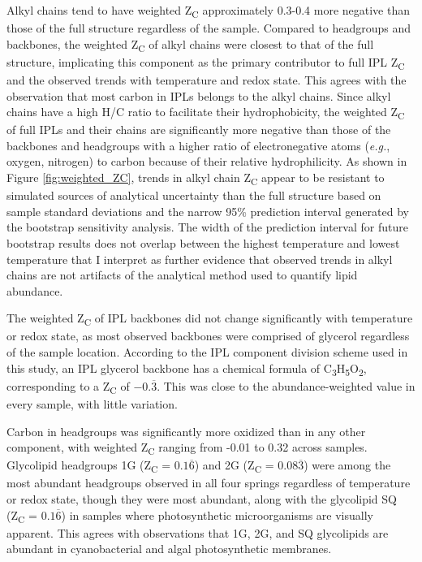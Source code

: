 Alkyl chains tend to have weighted Z\textsubscript{C} approximately 0.3-0.4 more negative than those of the full structure regardless of the sample. Compared to headgroups and backbones, the weighted Z\textsubscript{C} of alkyl chains were closest to that of the full structure, implicating this component as the primary contributor to full IPL Z\textsubscript{C} and the observed trends with temperature and redox state. This agrees with the observation that most carbon in IPLs belongs to the alkyl chains. Since alkyl chains have a high H/C ratio to facilitate their hydrophobicity, the weighted Z\textsubscript{C} of full IPLs and their chains are significantly more negative than those of the backbones and headgroups with a higher ratio of electronegative atoms (\textit{e.g.}, oxygen, nitrogen) to carbon because of their relative hydrophilicity. As shown in Figure \ref{fig:weighted_ZC}, trends in alkyl chain Z\textsubscript{C} appear to be resistant to simulated sources of analytical uncertainty than the full structure based on sample standard deviations and the narrow 95\% prediction interval generated by the bootstrap sensitivity analysis. The width of the prediction interval for future bootstrap results does not overlap between the highest temperature and lowest temperature that I interpret as further evidence that observed trends in alkyl chains are not artifacts of the analytical method used to quantify lipid abundance.

The weighted Z\textsubscript{C} of IPL backbones did not change significantly with temperature or redox state, as most observed backbones were comprised of glycerol regardless of the sample location. According to the IPL component division scheme used in this study, an IPL glycerol backbone has a chemical formula of C\textsubscript{3}H\textsubscript{5}O\textsubscript{2}, corresponding to a Z\textsubscript{C} of $-0.\overline{3}$. This was close to the abundance-weighted value in every sample, with little variation.

Carbon in headgroups was significantly more oxidized than in any other component, with weighted Z\textsubscript{C} ranging from -0.01 to 0.32 across samples. Glycolipid headgroups 1G (Z\textsubscript{C} = $0.1\overline{6}$) and 2G (Z\textsubscript{C} = $0.08\overline{3}$) were among the most abundant headgroups observed in all four springs regardless of temperature or redox state, though they were most abundant, along with the glycolipid SQ (Z\textsubscript{C} = $0.1\overline{6}$) in samples where photosynthetic microorganisms are visually apparent. This agrees with observations that 1G, 2G, and SQ glycolipids are abundant in cyanobacterial \citep{wada2009lipids} and algal \citep{guschina2006lipids} photosynthetic membranes.

